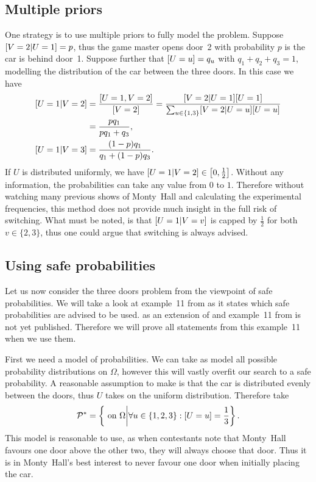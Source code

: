 \documentclass[twoside,a4paper]{article}
\theoremstyle{plain}
\theoremstyle{definition}
\theoremstyle{remark}
\numberwithin{equation}{section}
\let\P\relax
\DeclareMathOperator{\P}{\mathbb{P}}
\DeclareMathOperator{\1}{\mathbbm{1}}
\newcommand{\Pmod}{\mathcal{P}^*}
\begin{document}
\subsection{Multiple priors}\label{sec:monty_multiprior}
One strategy is to use multiple priors to fully model the problem. Suppose $\P[V=2|U=1]=p$, thus the game master opens door~2 with probability $p$ is the car is behind door~1. Suppose further that $\P[U=u]=q_u$ with $q_1+q_2+q_3=1$, modelling the distribution of the car between the three doors. In this case we have
\begin{align*}
\P[U=1|V=2]&=\frac{\P[U=1,V=2]}{\P[V=2]}=\frac{\P[V=2|U=1]\P[U=1]}{\sum_{u\in\{1,3\}}\P[V=2|U=u]\P[U=u]}\\
&=\frac{pq_1}{pq_1+q_3},\\
\P[U=1|V=3]&=\frac{(1-p)q_1}{q_1+(1-p)q_3}.
\end{align*}
If $U$ is distributed uniformly, we have $\P[U=1|V=2]\in\left[0,\frac{1}{2}\right]$. Without any information, the probabilities can take any value from $0$ to $1$. Therefore without watching many previous shows of Monty~Hall and calculating the experimental frequencies, this method does not provide much insight in the full risk of switching. What must be noted, is that $\P[U=1|V=v]$ is capped by $\frac{1}{2}$ for both $v\in\{2,3\}$, thus one could argue that switching is always advised.

\subsection{Using safe probabilities}
Let us now consider the three doors problem from the viewpoint of safe probabilities. We will take a look at example~11 from \cite{Grunwald16} as it states which safe probabilities are advised to be used. \cite{Grunwald16} as an extension of \cite{Grunwald18} and example~11 from \cite{Grunwald16} is not yet published. Therefore we will prove all statements from this example~11 when we use them.

First we need a model of probabilities. We can take as model all possible probability distributions on $\Omega$, however this will vastly overfit our search to a safe probability. A reasonable assumption to make is that the car is distributed evenly between the doors, thus $U$ takes on the uniform distribution. Therefore take
\[\Pmod=\left\{\P\text{ on }\Omega\middle|\forall u\in\{1,2,3\}:\P[U=u]=\frac{1}{3}\right\}.\]
This model is reasonable to use, as when contestants note that Monty~Hall favours one door above the other two, they will always choose that door. Thus it is in Monty~Hall's best interest to never favour one door when initially placing the car.
\end{document}
